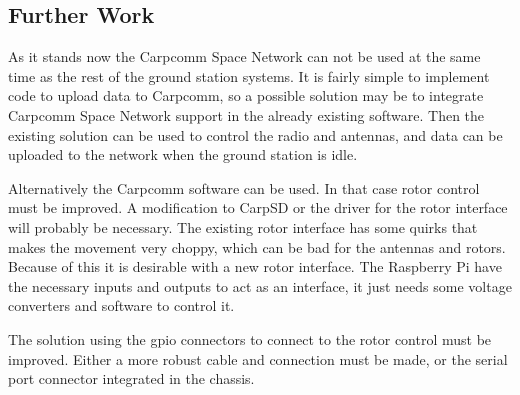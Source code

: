 \subsection{Further Work}
As it stands now the Carpcomm Space Network can not be used at the same time as the rest of the ground station systems. It is fairly simple to implement code to upload data to Carpcomm, so a possible solution may be to integrate Carpcomm Space Network support in the already existing software. Then the existing solution can be used to control the radio and antennas, and data can be uploaded to the network when the ground station is idle.

Alternatively the Carpcomm software can be used. In that case rotor control must be improved. A modification to CarpSD or the driver for the rotor interface will probably be necessary. The existing rotor interface has some quirks that makes the movement very choppy, which can be bad for the antennas and rotors. Because of this it is desirable with a new rotor interface. The Raspberry Pi have the necessary inputs and outputs to act as an interface, it just needs some voltage converters and software to control it.

The solution using the gpio connectors to connect to the rotor control must be improved. Either a more robust cable and connection must be made, or the serial port connector integrated in the chassis.